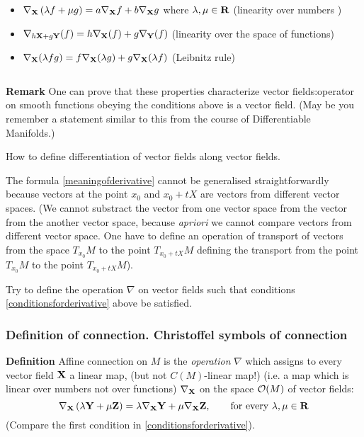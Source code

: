 \documentclass[12pt]{article}
\theoremstyle{theorem}
\numberwithin{equation}{section}
\begin{document}
\begin{itemize}
\item
   $\nabla_{{\bf X}}\left(\lambda f+\mu g\right)=
   a\nabla_{{\bf X}}f+b\nabla_{{\bf X}}g$
 where $\lambda,\mu\in {\bf R}$ (linearity over numbers )

\item
 $\nabla_{h{\bf X}+g\bf Y}(f)=h\nabla_{{\bf X}}(f)+g\nabla_{\bf Y}(f)$
                   (linearity over the space of functions)


\item

  $\nabla_{\bf X}(\lambda fg)=f\nabla_{\bf X}(\lambda g)+g\nabla_{\bf X}(\lambda f)$                       (Leibnitz rule)

\begin{equation}\label{conditionsforderivative}
\end{equation}

\end{itemize}

{\bf Remark}
One can prove that these properties characterize  vector fields:operator on smooth functions
obeying the conditions above is a vector field.
(May be you remember a statement similar  to this from the course of Differentiable Manifolds.)

\m

How to define differentiation of vector fields along vector fields.

The formula \eqref{meaningofderivative} cannot be generalised straightforwardly because
vectors at the point $x_0$ and $x_0+t X$ are vectors from different vector spaces.
(We cannot substract the vector from one vector space from the
vector from the another vector space, because {\it apriori}
we cannot compare vectors from different vector space.
One have to define an operation of transport of vectors from the space
$T_{x_0}M$ to the point $T_{x_0+tX}M$ defining the transport
from the point $T_{x_0}M$ to the point $T_{x_0+tX}M$).

Try to define the operation $\nabla$ on vector fields such
that conditions \eqref{conditionsforderivative} above  be satisfied.



\subsubsection{Definition of connection. Christoffel symbols of connection}

{\bf Definition} Affine connection on $M$ is the {\it operation} $\nabla$
which assigns to every vector field $\bf X$ a linear map, (but not $C(M)$-linear map!)
(i.e. a map which is linear over numbers not over functions)
 $\nabla_{\bf X}$
 on the space ${\cal O}(M)$ of
vector fields:
\begin{equation}\label{defofconnection}
  \nabla_{\bf X}\left(\lambda{\bf Y}+\mu{\bf Z}\right)=
   \lambda\nabla_{\bf X}{\bf Y}+\mu\nabla_{\bf X}{\bf Z},\qquad
   \hbox{for every $\lambda,\mu\in {\bf R}$}
\end{equation}
(Compare the first condition in \eqref{conditionsforderivative}).
\end{document}
